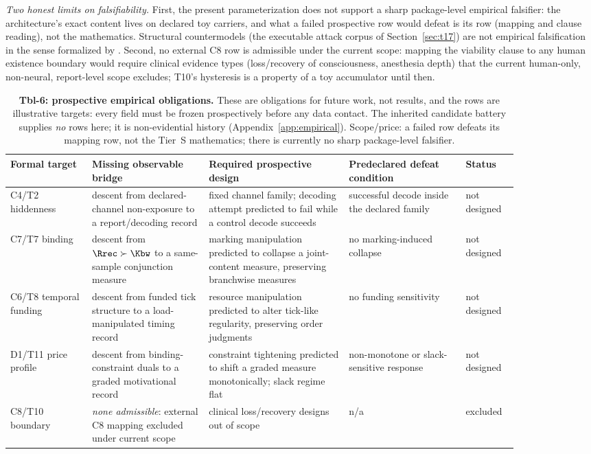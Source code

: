 \emph{Two honest limits on falsifiability.} First, the present
parameterization does not support a sharp package-level empirical falsifier:
the architecture's exact content lives on declared toy carriers, and what a
failed prospective row would defeat is its row (mapping and clause reading),
not the mathematics. Structural countermodels (the executable attack
corpus of Section~\ref{sec:t17}) are not empirical falsification in the sense
formalized by \citet{KleinerHoel2021}. Second, no external C8 row is
admissible under the current scope: mapping the viability clause to any
human existence boundary would require clinical evidence types
(loss/recovery of consciousness, anesthesia depth) that the current
human-only, non-neural, report-level scope excludes; T10's hysteresis is a
property of a toy accumulator until then.

\begin{table}[t]
\centering\footnotesize
\begin{tabular}{p{0.14\linewidth}p{0.2\linewidth}p{0.24\linewidth}p{0.2\linewidth}p{0.08\linewidth}}
\toprule
Formal target & Missing observable bridge & Required prospective design & Predeclared defeat condition & Status \\
\midrule
C4/T2 hiddenness & descent from declared-channel non-exposure to a report/decoding record & fixed channel family; decoding attempt predicted to fail while a control decode succeeds & successful decode inside the declared family & not designed \\
C7/T7 binding & descent from $\Rrec \succ \Kbw$ to a same-sample conjunction measure & marking manipulation predicted to collapse a joint-content measure, preserving branchwise measures & no marking-induced collapse & not designed \\
C6/T8 temporal funding & descent from funded tick structure to a load-manipulated timing record & resource manipulation predicted to alter tick-like regularity, preserving order judgments & no funding sensitivity & not designed \\
D1/T11 price profile & descent from binding-constraint duals to a graded motivational record & constraint tightening predicted to shift a graded measure monotonically; slack regime flat & non-monotone or slack-sensitive response & not designed \\
C8/T10 boundary & \emph{none admissible}: external C8 mapping excluded under current scope & clinical loss/recovery designs out of scope & n/a & excluded \\
\bottomrule
\end{tabular}
\caption{\textbf{Tbl-6: prospective empirical obligations.} These are
obligations for future work, not results, and the rows are illustrative
targets: every field must be frozen prospectively before any data contact.
The inherited candidate battery supplies \emph{no} rows here; it is
non-evidential history (Appendix~\ref{app:empirical}). Scope/price: a failed
row defeats its mapping row, not the Tier~S mathematics; there is currently
no sharp package-level falsifier.}
\label{tbl:obligations}
\end{table}

